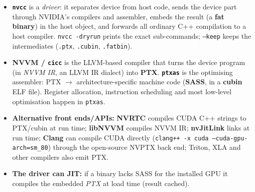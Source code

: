 \documentclass[10pt,a4paper,openany,oneside]{report}
\begin{document}
\begin{mustbox}
\begin{itemize}[nosep]
\item \textbf{\texttt{nvcc}} is a \emph{driver}: it separates device from host code, sends the device part through NVIDIA's compilers and assembler, embeds the result (a \textbf{fat binary}) in the host object, and forwards all ordinary C++ compilation to a host compiler. \texttt{nvcc -dryrun} prints the exact sub-commands; \texttt{--keep} keeps the intermediates (\texttt{.ptx}, \texttt{.cubin}, \texttt{.fatbin}).
\item \textbf{NVVM / \texttt{cicc}} is the LLVM-based compiler that turns the device program (in \emph{NVVM IR}, an LLVM IR dialect) into \textbf{PTX}. \textbf{\texttt{ptxas}} is the optimising assembler: PTX $\to$ architecture-specific machine code (\textbf{SASS}, in a \textbf{cubin} ELF file). Register allocation, instruction scheduling and most low-level optimisation happen in \texttt{ptxas}.
\item \textbf{Alternative front ends/APIs:} \textbf{NVRTC} compiles CUDA C++ strings to PTX/cubin at run time; \textbf{libNVVM} compiles NVVM IR; \textbf{nvJitLink} links at run time; \textbf{Clang} can compile CUDA directly (\texttt{clang++ -x cuda --cuda-gpu-arch=sm\_80}) through the open-source NVPTX back end; Triton, XLA and other compilers also emit PTX.
\item \textbf{The driver can JIT:} if a binary lacks SASS for the installed GPU it compiles the embedded \emph{PTX} at load time (result cached).
\end{itemize}
\end{mustbox}
\end{document}
